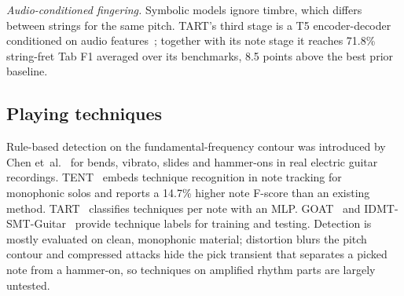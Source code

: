 \emph{Audio-conditioned fingering.} Symbolic models ignore timbre, which
differs between strings for the same pitch. TART's third stage is a T5
encoder-decoder conditioned on audio features~\cite{gupta2026tart}; together
with its note stage it reaches 71.8\% string-fret Tab F1 averaged over its
benchmarks, 8.5 points above the best prior baseline.

\subsection{Playing techniques}
\label{sec:techniques}
Rule-based detection on the fundamental-frequency contour was introduced by
Chen et~al.~\cite{chen2015technique} for bends, vibrato, slides and
hammer-ons in real electric guitar recordings. TENT~\cite{su2019tent} embeds
technique recognition in note tracking for monophonic solos and reports a
14.7\% higher note F-score than an existing method. TART~\cite{gupta2026tart}
classifies techniques per note with an MLP. GOAT~\cite{loth2025goat} and
IDMT-SMT-Guitar~\cite{kehling2014idmt} provide technique labels for training
and testing. Detection is mostly evaluated on clean, monophonic material;
distortion blurs the pitch contour and compressed attacks hide the pick
transient that separates a picked note from a hammer-on, so techniques on
amplified rhythm parts are largely untested.
